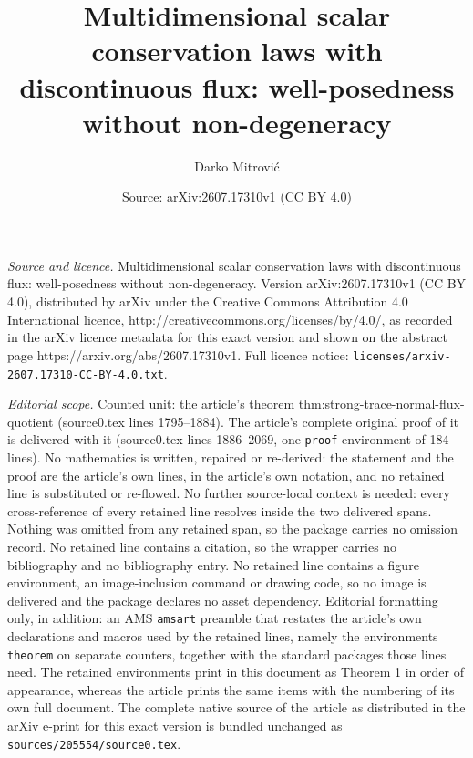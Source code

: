 \documentclass[10pt,a4paper]{amsart}
\title{Multidimensional scalar conservation laws with discontinuous flux: well-posedness without non-degeneracy}
\author{Darko Mitrovi\'c}
\date{Source: arXiv:2607.17310v1 (CC BY 4.0)}
\begin{document}
\maketitle

\noindent\emph{Source and licence.} Multidimensional scalar conservation laws with discontinuous flux: well-posedness without non-degeneracy. Version arXiv:2607.17310v1 (CC BY 4.0), distributed by arXiv under the Creative Commons Attribution 4.0 International licence, http://creativecommons.org/licenses/by/4.0/, as recorded in the arXiv licence metadata for this exact version and shown on the abstract page https://arxiv.org/abs/2607.17310v1. Full licence notice: \texttt{licenses/arxiv-2607.17310-CC-BY-4.0.txt}.\par\smallskip

\noindent\textit{Editorial scope.} Counted unit: the article's theorem thm:strong-trace-normal-flux-quotient (source0.tex lines 1795--1884). The article's complete original proof of it is delivered with it (source0.tex lines 1886--2069, one \texttt{proof} environment of 184 lines). No mathematics is written, repaired or re-derived: the statement and the proof are the article's own lines, in the article's own notation, and no retained line is substituted or re-flowed.  No further source-local context is needed: every cross-reference of every retained line resolves inside the two delivered spans.  Nothing was omitted from any retained span, so the package carries no omission record.  No retained line contains a citation, so the wrapper carries no bibliography and no bibliography entry.  No retained line contains a figure environment, an image-inclusion command or drawing code, so no image is delivered and the package declares no asset dependency.  Editorial formatting only, in addition: an AMS \texttt{amsart} preamble that restates the article's own declarations and macros used by the retained lines, namely the environments \texttt{theorem} on separate counters, together with the standard packages those lines need.  The retained environments print in this document as Theorem 1 in order of appearance, whereas the article prints the same items with the numbering of its own full document.  The complete native source of the article as distributed in the arXiv e-print for this exact version is bundled unchanged as \texttt{sources/205554/source0.tex}.
\end{document}
